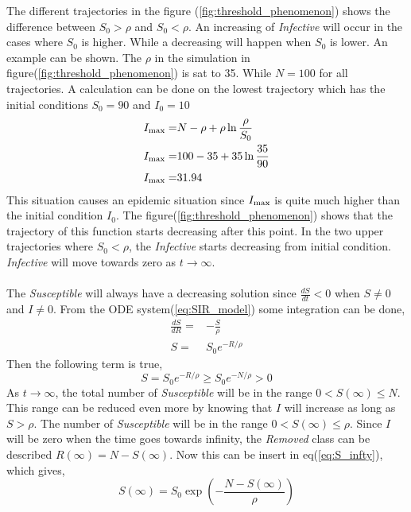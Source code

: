 \documentclass[%
twoside,                 %
final,                   %
10pt]{article}
\begin{document}
The different trajectories in the figure (\ref{fig:threshold_phenomenon}) shows the difference between $S_0 > \rho$ and $S_0< \rho$. An increasing of \emph{Infective} will occur in the cases where $S_0$ is higher. While a decreasing will happen when $S_0$ is lower. An example can be shown. The $\rho$ in the simulation in figure(\ref{fig:threshold_phenomenon}) is sat to 35. While $N=100$ for all trajectories. A calculation can be done on the lowest trajectory which has the initial conditions $S_0= 90$ and $I_0= 10$
\begin{align*}
I_{\textrm{max}} =& N-\rho + \rho \ln \frac{\rho}{S_0}\\
I_{\textrm{max}} =& 100-35 + 35 \ln \frac{35}{90}\\
I_{\textrm{max}} =& 31.94
\end{align*}
This situation causes an epidemic situation since $I_{\textrm{max}}$ is quite much higher than the initial condition $I_0$. The figure(\ref{fig:threshold_phenomenon}) shows that the trajectory of this function starts decreasing after this point. In the two upper trajectories where $S_0< \rho$, the \emph{Infective} starts decreasing from initial condition. \emph{Infective} will move towards zero as $t\rightarrow \infty$.
\\
\\
The \emph{Susceptible} will always have a decreasing solution since $\frac{dS}{dt}<0$ when $S\neq0$ and $I\neq0$. From the ODE system(\ref{eq:SIR_model}) some integration can be done,
\begin{equation} \label{eq:S_infty}
	\begin{aligned}
	\frac{dS}{dR} =& -\frac{S}{\rho}\\
	S =& S_0e^{-R/\rho} 
	\end{aligned}
\end{equation}
Then the following term is true,
\begin{equation} 
S = S_0e^{-R/\rho} \geq S_0e^{-N/\rho} > 0
\end{equation}
As $t\rightarrow \infty$, the total number of \emph{Susceptible} will be in the range $0< S(\infty)\leq N$. This range can be reduced even more by knowing that $I$ will increase as long as $S> \rho$. The number of \emph{Susceptible} will be in the range $0< S(\infty)\leq \rho$. Since $I$ will be zero when the time goes towards infinity, the \emph{Removed} class can be described $R(\infty)= N -S(\infty)$. Now this can be insert in eq(\ref{eq:S_infty}), which gives,
\begin{equation}
S(\infty) = S_0 \exp\left(-\frac{N-S(\infty)}{\rho}\right)
\end{equation}
\end{document}

